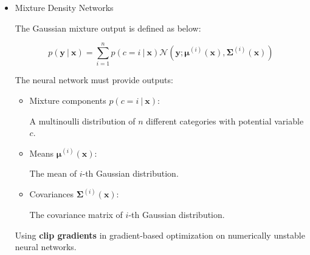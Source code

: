   \begin{itemize}

%
%

    \item{Mixture Density Networks}

    The Gaussian mixture output is defined as below:

    \begin{equation} \tag{6.35}
      \label{eq_6_35}
      p( \bm{y}\ |\ \bm{x} ) =
        \sum ^ n _ {i=1} p( c=i\ |\ \bm{x} )
        \mathcal{N}( \bm{y}; \bm{\mu} ^ {(i)} (\bm{x}), \bm{\Sigma} ^ {(i)} (\bm{x}) )
    \end{equation}

    The neural network must provide outputs:

    \begin{itemize}

      \item{Mixture components $p(c = i\ |\ \bm{x})$:}

        A multinoulli distribution of $n$ different categories with potential variable $c$.

      \item{Means $\bm{\mu} ^ {(i)} (\bm{x})$:}

        The mean of $i$-th Gaussian distribution.

      \item{Covariances $\bm{\Sigma} ^ {(i)} (\bm{x})$:}

        The covariance matrix of $i$-th Gaussian distribution.

    \end{itemize}

      Using \textbf{clip gradients} in gradient-based optimization on numerically unstable neural networks.

    \newpage


\end{itemize}
